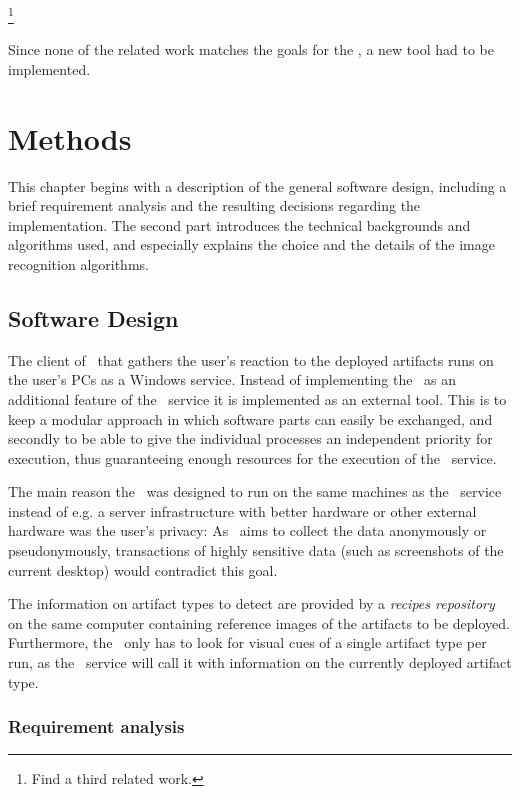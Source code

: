 \footnote{Find a third related work.}

Since none of the related work matches the goals for the \vad, a new tool had to be implemented.

\chapter{Methods}\label{ch:methods}

This chapter begins with a description of the general software design, including a brief requirement analysis and the resulting decisions regarding the implementation. The second part introduces the technical backgrounds and algorithms used, and especially explains the choice and the details of the image recognition algorithms.

\section{Software Design}\label{sec:software-design}

The client of \ape~that gathers the user's reaction to the deployed artifacts runs on the user's PCs as a Windows service. Instead of implementing the \vad~as an additional feature of the \ape~service it is implemented as an external tool. This is to keep a modular approach in which software parts can easily be exchanged, and secondly to be able to give the individual processes an independent priority for execution, thus guaranteeing enough resources for the execution of the \ape~service.

The main reason the \vd~was designed to run on the same machines as the \ape~service instead of e.g. a server infrastructure with better hardware or other external hardware was the user's privacy:  As \ape~aims to collect the data anonymously or pseudonymously, transactions of highly sensitive data (such as screenshots of the current desktop) would contradict this goal.

The information on artifact types to detect are provided by a \emph{recipes repository} on the same computer containing reference images of the artifacts to be deployed. Furthermore, the \vd~only has to look for visual cues of a single artifact type per run, as the \ape~service will call it with information on the currently deployed artifact type.

\subsection{Requirement analysis}

